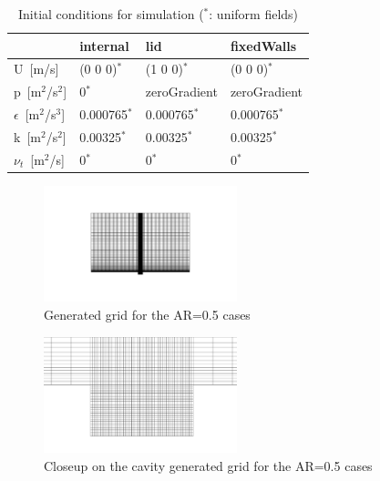 \documentclass[twocolumn,10pt]{asme2ej}
\begin{document}
\begin{table}[b]
\begin{center}
\begin{tabular}{| l | l | l | l | }
\hline
                         & internal     & lid          & fixedWalls   \\
\hline
U~[m/s]                  & (0 0 0)$^*$  & (1 0 0)$^*$  & (0 0 0)$^*$  \\
p~[m$^2$/s$^2$]          & 0$^*$        & zeroGradient & zeroGradient \\
$\epsilon$~[m$^2$/s$^3$] & 0.000765$^*$ & 0.000765$^*$ & 0.000765$^*$ \\
k~[m$^2$/s$^2$]          & 0.00325$^*$  & 0.00325$^*$  & 0.00325$^*$  \\
$\nu_t$~[m$^2$/s]        & 0$^*$        & 0$^*$        & 0$^*$        \\

\hline
\end{tabular}
\caption{Initial conditions for simulation ($^*$: uniform fields)}
\label{initial_conditions}
\end{center}
\end{table}

\begin{figure}[tb]
\begin{center}
\includegraphics[width=0.5\textwidth]{figure/grid.png}
\caption{Generated grid for the AR=0.5 cases}
\label{grid_figure}
\end{center}
\end{figure}

\begin{figure}[tb]
\begin{center}
\includegraphics[width=0.5\textwidth]{figure/tight_grid.png}
\caption{Closeup on the cavity generated grid for the AR=0.5 cases}
\label{grid_figure}
\end{center}
\end{figure}
\end{document}
